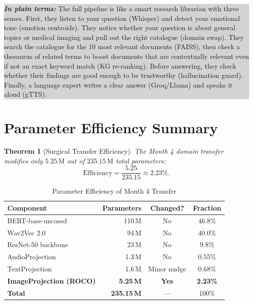 \documentclass[12pt, a4paper]{article}
\theoremstyle{definition}
\theoremstyle{plain}
\newtheorem{theorem}{Theorem}[section]
\theoremstyle{remark}
\newcommand{\layman}[1]{%
  \vspace{4pt}%
  \noindent\colorbox{lightgray}{\parbox{\dimexpr\linewidth-2\fboxsep}{%
    \textbf{\textit{In plain terms:}} #1}}%
  \vspace{4pt}%
}
\begin{document}
\layman{The full pipeline is like a smart research librarian with three senses. First, they listen to your question (Whisper) and detect your emotional tone (emotion centroids). They notice whether your question is about general topics or medical imaging and pull out the right catalogue (domain swap). They search the catalogue for the 10 most relevant documents (FAISS), then check a thesaurus of related terms to boost documents that are contextually relevant even if not an exact keyword match (KG re-ranking). Before answering, they check whether their findings are good enough to be trustworthy (hallucination guard). Finally, a language expert writes a clear answer (Groq/Llama) and speaks it aloud (gTTS).}

\section{Parameter Efficiency Summary}
\label{sec:efficiency}

\begin{theorem}[Surgical Transfer Efficiency]
\label{thm:efficiency}
The Month 4 domain transfer modifies only $5.25\,\text{M}$ out of $235.15\,\text{M}$ total parameters:
\[
\text{Efficiency} = \frac{5.25}{235.15} \approx 2.23\%.
\]
\end{theorem}

\begin{table}[h]
\centering
\caption{Parameter Efficiency of Month 4 Transfer}
\label{tab:efficiency}
\begin{tabular}{lrcc}
\toprule
\textbf{Component} & \textbf{Parameters} & \textbf{Changed?} & \textbf{Fraction} \\
\midrule
BERT-base-uncased & 110\,M & No  & 46.8\% \\
Wav2Vec 2.0       & 94\,M  & No  & 40.0\% \\
ResNet-50 backbone & 23\,M & No  & 9.8\% \\
AudioProjection   & 1.3\,M & No  & 0.55\% \\
TextProjection    & 1.6\,M & Minor nudge & 0.68\% \\
\rowcolor{trainableorange}
\textbf{ImageProjection (ROCO)} & \textbf{5.25\,M} & \textbf{Yes} & \textbf{2.23\%} \\
\midrule
\textbf{Total} & \textbf{235.15\,M} & --- & 100\% \\
\bottomrule
\end{tabular}
\end{table}
\end{document}
